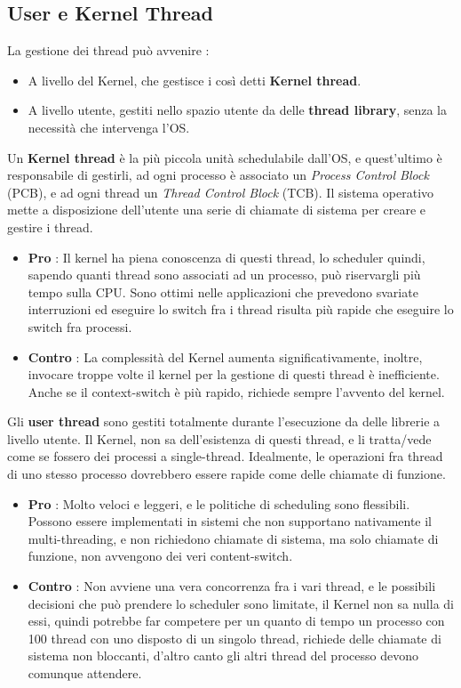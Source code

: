 \documentclass[12pt, letterpaper]{article}
\begin{document}
\subsection{User e Kernel Thread}
La gestione dei thread può avvenire :\begin{itemize}
    \item A livello del Kernel, che gestisce i così detti \textbf{Kernel thread}.
    \item A livello utente, gestiti nello spazio utente da delle \textbf{thread library}, senza la necessità che intervenga l'OS.
\end{itemize} 
Un \textbf{Kernel thread} è la più piccola unità schedulabile dall'OS, e quest'ultimo è responsabile di gestirli, ad 
ogni processo è associato un \textit{Process Control Block} (PCB), e ad ogni thread un \textit{Thread Control Block} (TCB). 
Il sistema operativo mette a disposizione dell'utente una serie di chiamate di sistema per creare e gestire i thread.\begin{itemize}
    \item \textbf{Pro} : Il kernel ha piena conoscenza di questi thread, lo scheduler quindi, sapendo quanti thread sono associati 
    ad un processo, può riservargli più tempo sulla CPU. Sono ottimi nelle applicazioni che prevedono svariate interruzioni 
    ed eseguire lo switch fra i thread risulta più rapide che eseguire lo switch fra processi. 
    \item \textbf{Contro} : La complessità del Kernel aumenta significativamente, inoltre, invocare troppe 
    volte il kernel per 
    la gestione di questi thread è inefficiente. Anche se il context-switch è più rapido, richiede sempre l'avvento del 
    kernel.
\end{itemize}
Gli \textbf{user thread} sono gestiti totalmente durante l'esecuzione da delle librerie a livello utente. Il Kernel, non 
sa dell'esistenza di questi thread, e li tratta/vede come se fossero dei processi a single-thread. Idealmente, le operazioni fra 
thread di uno stesso processo dovrebbero essere rapide come delle chiamate di funzione.\begin{itemize}
    \item \textbf{Pro} : Molto veloci e leggeri, e le politiche di scheduling sono flessibili. Possono essere 
    implementati in sistemi che non supportano nativamente il multi-threading, e non richiedono chiamate di sistema, ma 
    solo chiamate di funzione, non avvengono dei veri content-switch. 
    \item \textbf{Contro} : Non avviene una vera concorrenza fra i vari thread, e le possibili decisioni che può 
    prendere lo scheduler sono limitate, il Kernel non sa nulla di essi, quindi potrebbe far competere per un quanto 
    di tempo un processo con 100 thread con uno disposto di un singolo thread, richiede delle chiamate di sistema non 
    bloccanti, d'altro canto gli altri thread del processo devono comunque attendere.
\end{itemize}
\end{document}
